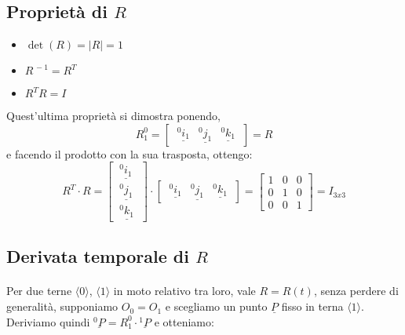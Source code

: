 \subsection{Proprietà di $R$}
\begin{itemize}
	\item $\det(R) = \vert R \vert = 1$
	\item $R^{\,-1} = R^{T}$
	\item $R^{T}R = I$
\end{itemize}
Quest'ultima proprietà si dimostra ponendo, 
\begin{equation*}
	R_1^0 =
	\begin{bmatrix}
		\:\underline{^0i_1} & \underline{^0j_1} & \underline{^0k_1}\:
	\end{bmatrix}
	= R
\end{equation*} e facendo il prodotto con la sua trasposta, ottengo:
\begin{equation*}
	R^{T} \cdot R =
	\begin{bmatrix}
		\:\underline{^0i_1}\: \\
		\:\underline{^0j_1}\: \\
		\:\underline{^0k_1} \:
	\end{bmatrix}
	\cdot
	\begin{bmatrix}
		\: \underline{^0i_1} & \underline{^0j_1} & \underline{^0k_1} \:
	\end{bmatrix}
	= 
	\begin{bmatrix}
		1 & 0 & 0 \\
		0 & 1 & 0 \\
		0 & 0 & 1 
	\end{bmatrix}
	= I_{3x3}
\end{equation*}

\subsection{Derivata temporale di $R$}
\paragraph{}
Per due terne $\langle 0 \rangle$, $\langle 1 \rangle$ in moto relativo tra loro, vale $R = R(t)$, senza perdere di generalità, supponiamo $O_0 = O_1$ e scegliamo un punto $\underline{P}$ fisso in terna $\langle 1 \rangle$. Deriviamo quindi $\underline{^0P} = R_{1}^{0} \cdot \underline{^1P}$ e otteniamo:

